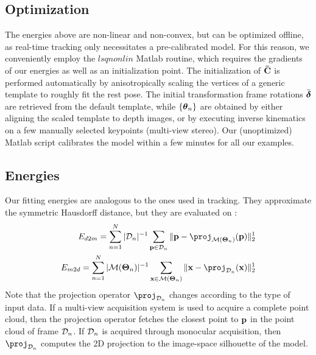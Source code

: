 \subsection*{Optimization}
The energies above are non-linear and non-convex, but can be optimized offline, as real-time tracking only necessitates a pre-calibrated model. For this reason, we conveniently employ the $lsqnonlin$ Matlab routine, which requires the gradients of our energies as well as an initialization point.
The initialization of ${\mathbf{\bar{C}}}$ is performed automatically by anisotropically scaling the vertices of a generic template to roughly fit the rest pose. The initial transformation frame rotations $\bar{\boldsymbol{\delta}}$ are retrieved from the default template, while ${\{\boldsymbol{\theta}_n\}}$ are obtained by either aligning the scaled template to depth images, or by executing inverse kinematics on a few manually selected keypoints (multi-view stereo).
% 
% 
Our (unoptimized) Matlab script calibrates the model within a few minutes for all our examples.


\subsection{Energies}
Our fitting energies are analogous to the ones used in tracking. They approximate the symmetric Hausdorff distance, but they are evaluated on :
% 
\begin{eqnarray}
E_{d2m} = 
\sum_{n=1}^N |\depth_n|^{-1} 
\sum_{\pointHmodel \in \depth_n} 
\| \pointHmodel - \proj_{\model(\parsHmodel_n)}(\pointHmodel)\|_2^1 \\
E_{m2d} = 
\sum_{n=1}^N |\model(\parsHmodel_n)|^{-1} 
\sum_{\pixelHmodel \in \model(\parsHmodel_n)} 
\| \pixelHmodel - \proj_{\depth_n}(\pixelHmodel)\|_2^1
\end{eqnarray}
% 
Note that the projection operator $\proj_{\depth_n}$ changes according to the type of input data. If a multi-view acquisition system is used to acquire a complete point cloud, then the projection operator fetches the closest point to $\mathbf{p}$ in the point cloud of frame $\mathcal{D}_n$. If $\mathcal{D}_n$ is acquired through monocular acquisition, then $\proj_{\depth_n}$ computes the 2D projection to the image-space silhouette of the model.

